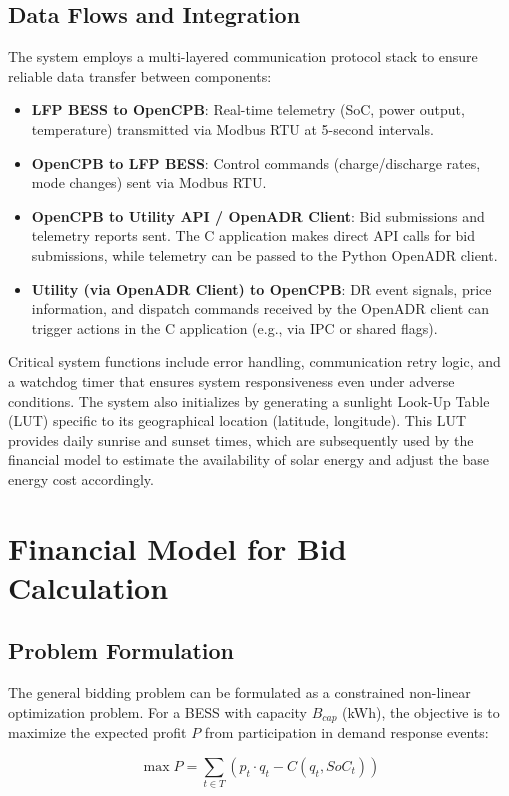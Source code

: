 \documentclass[11pt,a4paper]{article}
\begin{document}
\subsection{Data Flows and Integration}
The system employs a multi-layered communication protocol stack to ensure reliable data transfer between components:

\begin{itemize}
    \item \textbf{LFP BESS to OpenCPB}: Real-time telemetry (SoC, power output, temperature) transmitted via Modbus RTU at 5-second intervals.
    \item \textbf{OpenCPB to LFP BESS}: Control commands (charge/discharge rates, mode changes) sent via Modbus RTU.
    \item \textbf{OpenCPB to Utility API / OpenADR Client}: Bid submissions and telemetry reports sent. The C application makes direct API calls for bid submissions, while telemetry can be passed to the Python OpenADR client.
    \item \textbf{Utility (via OpenADR Client) to OpenCPB}: DR event signals, price information, and dispatch commands received by the OpenADR client can trigger actions in the C application (e.g., via IPC or shared flags).
\end{itemize}

Critical system functions include error handling, communication retry logic, and a watchdog timer that ensures system responsiveness even under adverse conditions. The system also initializes by generating a sunlight Look-Up Table (LUT) specific to its geographical location (latitude, longitude). This LUT provides daily sunrise and sunset times, which are subsequently used by the financial model to estimate the availability of solar energy and adjust the base energy cost accordingly.

\section{Financial Model for Bid Calculation}
\subsection{Problem Formulation}
The general bidding problem can be formulated as a constrained non-linear optimization problem. For a BESS with capacity $B_{cap}$ (kWh), the objective is to maximize the expected profit $P$ from participation in demand response events:

\begin{equation}
\max P = \sum_{t \in T} (p_t \cdot q_t - C(q_t, SoC_t))
\end{equation}
\end{document}
